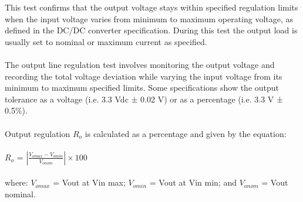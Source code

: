 This test confirms that the output voltage stays within specified regulation limits when the input voltage varies from minimum to maximum operating voltage, as defined in the DC/DC converter specification. During this test the output load is usually set to nominal or maximum current as specified.
\\ \\
The output line regulation test involves monitoring the output voltage and recording the total voltage deviation while varying the input voltage from its minimum to maximum specified limits. Some specifications show the output tolerance as a voltage (i.e. 3.3 Vdc ± 0.02 V) or as a percentage (i.e. 3.3 V ± 0.5\%).
\\ \\
Output regulation $R_{o}$ is calculated as a percentage and given by the equation:
\\ \\
\hspace*{5cm}$R_{o}$ = $\left | \frac{V_{omax}-V_{omin}}{V_{onom}} \right | \times 100$
\\ \\
where:
$V_{omax}$ = Vout at Vin max; 
$V_{omin}$ = Vout at Vin min; and
$V_{onom}$ = Vout nominal.


\pagebreak

